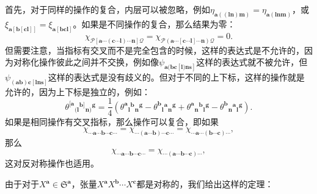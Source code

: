 首先，对于同样的操作的复合，内层可以被忽略，例如$\eta _{\boldsymbol{a}((\boldsymbol{ln})\boldsymbol{m})} =\eta _{\boldsymbol{a}(\boldsymbol{lnm})}$，或$\xi _{\boldsymbol{a}[\boldsymbol{b}[\boldsymbol{cl}]]} =\xi _{\boldsymbol{a}[\boldsymbol{bcl}]}$。如果是不同操作的复合，那么结果为零：
\begin{equation*}
	\chi _{\mathcal{P}[\boldsymbol{a} \cdots (\boldsymbol{c} \cdots \boldsymbol{l}) \cdots \boldsymbol{n}]\mathcal{Q}} =\chi _{\mathcal{P}(\boldsymbol{a} \cdots [\boldsymbol{c} \cdots \boldsymbol{l}] \cdots \boldsymbol{n})\mathcal{Q}} =0.
\end{equation*}
但需要注意，当指标有交叉而不是完全包含的时候，这样的表达式是不允许的，因为对称化操作彼此之间并不交换，例如像$\psi _{\boldsymbol{a}(\boldsymbol{bc}[\boldsymbol{l})\boldsymbol{ns}]}$这样的表达式就不被允许，但$\psi _{(\boldsymbol{ab})\boldsymbol{c}[\boldsymbol{lns}]}$这样的表达式是没有歧义的。但对于不同的上下标，这样的操作就是允许的，因为上下标是独立的，例如：
\begin{equation*}
	\theta ^{[\boldsymbol{a}}{}{_{(\boldsymbol{l}}}^{\boldsymbol{b}]}{}{_{\boldsymbol{n})}}^{\boldsymbol{g}} =\frac{1}{4} (\theta ^{\boldsymbol{a}}{}{_{\boldsymbol{l}}}^{\boldsymbol{b}}{}{_{\boldsymbol{n}}}^{\boldsymbol{g}} -\theta ^{\boldsymbol{b}}{}{_{\boldsymbol{l}}}^{\boldsymbol{a}}{}{_{\boldsymbol{n}}}^{\boldsymbol{g}} +\theta ^{\boldsymbol{a}}{}{_{\boldsymbol{n}}}^{\boldsymbol{b}}{}{_{\boldsymbol{l}}}^{\boldsymbol{g}} -\theta ^{\boldsymbol{b}}{}{_{\boldsymbol{n}}}^{\boldsymbol{a}}{}{_{\boldsymbol{l}}}^{\boldsymbol{g}} ).
\end{equation*}
如果是相同操作有交叉指标，那么操作可以复合，即如果
\begin{equation*}
	\chi _{\cdots \boldsymbol{a} \cdots \boldsymbol{b} \cdots \boldsymbol{c} \cdots } =\chi _{\cdots (\boldsymbol{a} \cdots \boldsymbol{b}) \cdots \boldsymbol{c} \cdots } =\chi _{\cdots \boldsymbol{a} \cdots (\boldsymbol{b} \cdots \boldsymbol{c}) \cdots } ,
\end{equation*}
那么
\begin{equation*}
	\chi _{\cdots \boldsymbol{a} \cdots \boldsymbol{b} \cdots \boldsymbol{c} \cdots } =\chi _{\cdots (\boldsymbol{a} \cdots \boldsymbol{b} \cdots \boldsymbol{c}) \cdots } ,
\end{equation*}
这对反对称操作也适用。



由于对于$X^{\boldsymbol{a}} \in \mathfrak{S}^{\boldsymbol{a}}$，张量$X^{\boldsymbol{a}} X^{\boldsymbol{b}} \cdots X^{\boldsymbol{c}}$都是对称的，我们给出这样的定理：

